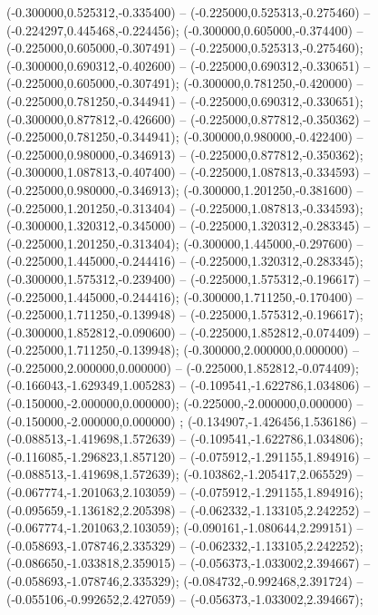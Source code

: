  (-0.300000,0.525312,-0.335400) -- (-0.225000,0.525313,-0.275460) -- (-0.224297,0.445468,-0.224456);
 (-0.300000,0.605000,-0.374400) -- (-0.225000,0.605000,-0.307491) -- (-0.225000,0.525313,-0.275460);
 (-0.300000,0.690312,-0.402600) -- (-0.225000,0.690312,-0.330651) -- (-0.225000,0.605000,-0.307491);
 (-0.300000,0.781250,-0.420000) -- (-0.225000,0.781250,-0.344941) -- (-0.225000,0.690312,-0.330651);
 (-0.300000,0.877812,-0.426600) -- (-0.225000,0.877812,-0.350362) -- (-0.225000,0.781250,-0.344941);
 (-0.300000,0.980000,-0.422400) -- (-0.225000,0.980000,-0.346913) -- (-0.225000,0.877812,-0.350362);
 (-0.300000,1.087813,-0.407400) -- (-0.225000,1.087813,-0.334593) -- (-0.225000,0.980000,-0.346913);
 (-0.300000,1.201250,-0.381600) -- (-0.225000,1.201250,-0.313404) -- (-0.225000,1.087813,-0.334593);
 (-0.300000,1.320312,-0.345000) -- (-0.225000,1.320312,-0.283345) -- (-0.225000,1.201250,-0.313404);
 (-0.300000,1.445000,-0.297600) -- (-0.225000,1.445000,-0.244416) -- (-0.225000,1.320312,-0.283345);
 (-0.300000,1.575312,-0.239400) -- (-0.225000,1.575312,-0.196617) -- (-0.225000,1.445000,-0.244416);
 (-0.300000,1.711250,-0.170400) -- (-0.225000,1.711250,-0.139948) -- (-0.225000,1.575312,-0.196617);
 (-0.300000,1.852812,-0.090600) -- (-0.225000,1.852812,-0.074409) -- (-0.225000,1.711250,-0.139948);
 (-0.300000,2.000000,0.000000) -- (-0.225000,2.000000,0.000000) -- (-0.225000,1.852812,-0.074409);
 (-0.166043,-1.629349,1.005283) -- (-0.109541,-1.622786,1.034806) -- (-0.150000,-2.000000,0.000000);
 (-0.225000,-2.000000,0.000000) -- (-0.150000,-2.000000,0.000000) ;
 (-0.134907,-1.426456,1.536186) -- (-0.088513,-1.419698,1.572639) -- (-0.109541,-1.622786,1.034806);
 (-0.116085,-1.296823,1.857120) -- (-0.075912,-1.291155,1.894916) -- (-0.088513,-1.419698,1.572639);
 (-0.103862,-1.205417,2.065529) -- (-0.067774,-1.201063,2.103059) -- (-0.075912,-1.291155,1.894916);
 (-0.095659,-1.136182,2.205398) -- (-0.062332,-1.133105,2.242252) -- (-0.067774,-1.201063,2.103059);
 (-0.090161,-1.080644,2.299151) -- (-0.058693,-1.078746,2.335329) -- (-0.062332,-1.133105,2.242252);
 (-0.086650,-1.033818,2.359015) -- (-0.056373,-1.033002,2.394667) -- (-0.058693,-1.078746,2.335329);
 (-0.084732,-0.992468,2.391724) -- (-0.055106,-0.992652,2.427059) -- (-0.056373,-1.033002,2.394667);
